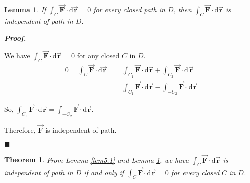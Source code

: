 \documentclass[12pt,a4paper]{article}
\newtheorem{thm}{Theorem}[subsection]
\newtheorem{lem}{Lemma}[section]
\newenvironment*{prf}{\par\indent\textbf{\textit{Proof. }}\par}{\par\hfill$\blacksquare$\par}
\def\dsst{\displaystyle}
\def\d{{\mathrm{d}}}
\def\intC{\dsst\int_C}
\def\vecr{\vec{\boldsymbol{\textbf{r}}}}
\def\F{\vec{\boldsymbol{\textbf{F}}}}
\begin{document}
\begin{lem}\label{lem5.2}
	If $\intC\F\cdot\d\vecr=0$ for every closed path in $D$, then $\intC\F\cdot\d\vecr$ is independent of path in $D$.
\end{lem}
\begin{prf}
	We have $\intC\F\cdot\d\vecr=0$ for any closed $C$ in $D$. \[\begin{aligned}0=\intC\F\cdot\d\vecr&=\int_{C_1}\F\cdot\d\vecr+\int_{C_2}\F\cdot\d\vecr\\&=\int_{C_1}\F\cdot\d\vecr-\int_{-C_2}\F\cdot\d\vecr\end{aligned}\]\par So, $\dsst\int_{C_1}\F\cdot\d\vecr=\int_{-C_2}\F\cdot\d\vecr.$\par Therefore, $\F$ is independent of path. 
\end{prf}
\begin{thm}
	From Lemma \ref{lem5.1} and Lemma \ref{lem5.2}, we have $\intC\F\cdot\d\vecr$ is independent of path in $D$ if and only if $\intC\F\cdot\d\vecr=0$ for every closed $C$ in $D$. 
\end{thm}
\end{document}
